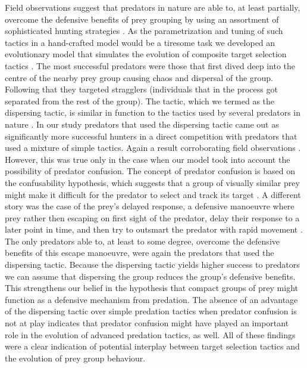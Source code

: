 Field observations suggest that predators in nature are able to, at least partially, overcome the defensive benefits of prey grouping by using an assortment of sophisticated hunting strategies \cite{cresswell2011predicting,forsman1998visual,gazda2005division,handegard2012dynamics,hector1986cooperative,kane2014falcons,lopez2006bottlenose,nottestad2002digging,rutz2012predator}. As the parametrization and tuning of such tactics in a hand-crafted model would be a tiresome task we developed an evolutionary model that simulates the evolution of composite target selection tactics \cite{demsar2015simulating}. The most successful predators were those that first dived deep into the centre of the nearby prey group causing chaos and dispersal of the group. Following that they targeted stragglers (individuals that in the process got separated from the rest of the group). The tactic, which we termed as the dispersing tactic, is similar in function to the tactics used by several predators in nature \cite{larsson2012why,pavlov2000patterns}. In our study predators that used the dispersing tactic came out as significantly more successful hunters in a direct competition with predators that used a mixture of simple tactics. Again a result corroborating field observations \cite{pavlov2000patterns}. However, this was true only in the case when our model took into account the possibility of predator confusion. The concept of predator confusion is based on the confusability hypothesis, which suggests that a group of visually similar prey might make it difficult for the predator to select and track its target \cite{nishimura2002predator,zheng2005behavior,kunz2006prey,olson2013predator,olson2016evolution,rutz2012predator}. A different story was the case of the prey's delayed response, a defensive manoeuvre where prey rather then escaping on first sight of the predator, delay their response to a later point in time, and then try to outsmart the predator with rapid movement \cite{partridge1982structure}. The only predators able to, at least to some degree, overcome the defensive benefits of this escape manoeuvre, were again the predators that used the dispersing tactic. Because the dispersing tactic yields higher success to predators we can assume that dispersing the group reduces the group's defensive benefits. This strengthens our belief in the hypothesis that compact groups of prey might function as a defensive mechanism from predation. The absence of an advantage of the dispersing tactic over simple predation tactics when predator confusion is not at play indicates that predator confusion might have played an important role in the evolution of advanced predation tactics, as well. All of these findings were a clear indication of potential interplay between target selection tactics and the evolution of prey group behaviour.

